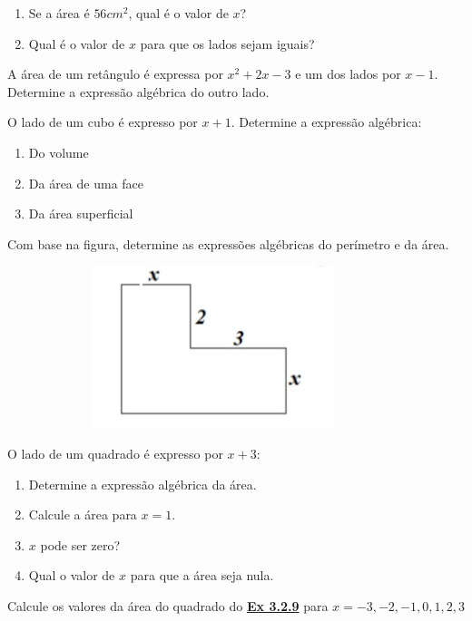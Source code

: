 \begin{description}
\begin{enumerate}[label=\alph*)]
\item Se a área é $56cm^2$, qual é o valor de $x$?

\item Qual é o valor de $x$ para que os lados sejam iguais?
\end{enumerate}

\item[\thesubsection.\theexercicio] A área de um retângulo é expressa por $x^2+2x-3$ e um dos lados por $x-1$. Determine a expressão algébrica do outro lado.

\item[\thesubsection.\theexercicio] O lado de um cubo é expresso por $x+1$. Determine a expressão algébrica:

\begin{enumerate}[label=\alph*)]
    \item Do volume
    \item Da área de uma face
    \item Da área superficial
\end{enumerate}

\item[\thesubsection.\theexercicio] Com base na figura, determine as expressões algébricas do perímetro e da área.

\begin{figure}[H]
~~~~~~~
\includegraphics[scale=.8]{capitulos/expressoes_algebricas/media/image5.png}
\end{figure}

\label{ex:3.2.9} \item[\thesubsection.\theexercicio] O lado de um quadrado é expresso por $x+3$:

\begin{enumerate}[label=\alph*)]
\item Determine a expressão algébrica da área.

\item Calcule a área para $x = 1$.

\item $x$ pode ser zero?

\item Qual o valor de $x$ para que a área seja nula.
\end{enumerate}

\item[\thesubsection.\theexercicio] Calcule os valores da área do quadrado do \hyperref[ex:3.2.9]{\textbf{Ex 3.2.9}} para $x = {-3,-2,-1,0,1,2,3}$

\end{description}


